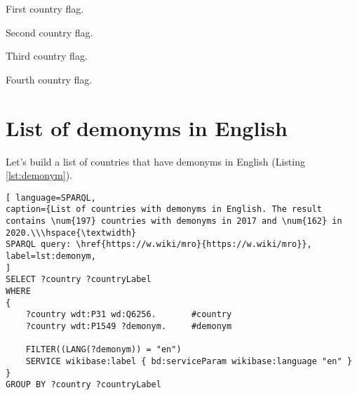\begin{marginfigure}
	{
		\setlength{\fboxsep}{0pt}%
		\setlength{\fboxrule}{1pt}%
	}
	\caption{First country flag.}%
	\label{fig:flag_kor}%
\end{marginfigure}
\begin{marginfigure}
	{
		\setlength{\fboxsep}{0pt}%
		\setlength{\fboxrule}{1pt}%
	}
	\caption{Second country flag.}%
	\label{fig:flag_singapore}%
\end{marginfigure}
\begin{marginfigure}
	{
		\setlength{\fboxsep}{0pt}%
		\setlength{\fboxrule}{1pt}%
	}
	\caption{Third country flag.}%
	\label{fig:flag_israel}%
\end{marginfigure}
\begin{marginfigure}
	{
		\setlength{\fboxsep}{0pt}%
		\setlength{\fboxrule}{1pt}%
	}
	\caption{Fourth country flag.}%
	\label{fig:flag_mongolia}%
\end{marginfigure}

\section{List of demonyms in English}

Let's build a list of countries that have demonyms in English (Listing \ref{lst:demonym}).

\begin{lstlisting}[ language=SPARQL, 
caption={List of countries with demonyms in English. The result contains \num{197} countries with demonyms in 2017 and \num{162} in 2020.\\\hspace{\textwidth}
SPARQL query: \href{https://w.wiki/mro}{https://w.wiki/mro}},
label=lst:demonym, 
]
SELECT ?country ?countryLabel 
WHERE
{
	?country wdt:P31 wd:Q6256.       #country
	?country wdt:P1549 ?demonym.     #demonym

	FILTER((LANG(?demonym)) = "en")
	SERVICE wikibase:label { bd:serviceParam wikibase:language "en" }
}
GROUP BY ?country ?countryLabel
\end{lstlisting}


